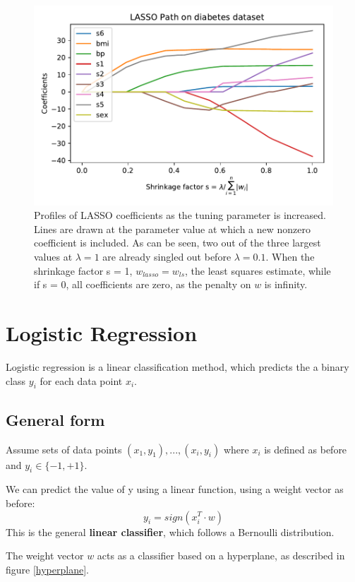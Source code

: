 \documentclass[%
 reprint,
 amsmath,amssymb,
 aps,
]{revtex4-1}
\begin{document}
\begin{figure}
  \includegraphics[width=\linewidth]{../figs/LASSO_paths}
  \caption{Profiles of LASSO coefficients as the tuning parameter is increased. Lines are drawn at the parameter value at which a new nonzero coefficient is included.
  As can be seen, two out of the three largest values at $\lambda = 1$ are already singled out before $\lambda = 0.1$.
  When the shrinkage factor s = 1, $w_{lasso} = w_{ls}$, the least squares estimate, while if s = 0, all coefficients are zero, as the penalty on $w$ is infinity.
  }
  \label{LASSOpath}
\end{figure}


\section{Logistic Regression}
Logistic regression is a linear classification method, which predicts the a binary class $y_i$ for each data point $x_i$.

\subsection{General form}
Assume sets of data points $(x_1, y_1), ... , (x_i, y_i)$ where $x_i$ is defined as before and $y_i \in \{-1, +1\}$.

We can predict the value of y using a linear function, using a weight vector as before:
\[
y_i = sign(x_{i}^T\cdot w)
\]
This is the general \textbf{linear classifier}, which follows a Bernoulli distribution.

The weight vector $w$ acts as a classifier based on a hyperplane, as described in figure \ref{hyperplane}.
\end{document}
